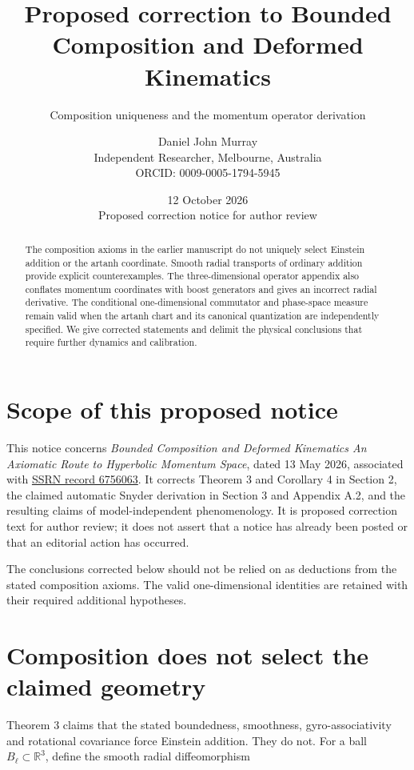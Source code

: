 \documentclass[
  11pt,
  a4paper,
]{article}
\title{Proposed correction to Bounded Composition and Deformed Kinematics}
\subtitle{Composition uniqueness and the momentum operator derivation}
\author{Daniel John Murray\\{\small Independent Researcher, Melbourne, Australia}\\{\small ORCID: 0009-0005-1794-5945}}
\date{12 October 2026\\{\small Proposed correction notice for author review}}
\begin{document}
\maketitle
\begin{abstract}
The composition axioms in the earlier manuscript do not uniquely select Einstein addition or the artanh coordinate. Smooth radial transports of ordinary addition provide explicit counterexamples. The three-dimensional operator appendix also conflates momentum coordinates with boost generators and gives an incorrect radial derivative. The conditional one-dimensional commutator and phase-space measure remain valid when the artanh chart and its canonical quantization are independently specified. We give corrected statements and delimit the physical conclusions that require further dynamics and calibration.
\end{abstract}

\section{Scope of this proposed notice}\label{scope-of-this-proposed-notice}

This notice concerns \emph{Bounded Composition and Deformed Kinematics An Axiomatic Route to Hyperbolic Momentum Space}, dated 13 May 2026, associated with \href{https://ssrn.com/abstract=6756063}{SSRN record 6756063}. It corrects Theorem 3 and Corollary 4 in Section 2, the claimed automatic Snyder derivation in Section 3 and Appendix A.2, and the resulting claims of model-independent phenomenology. It is proposed correction text for author review; it does not assert that a notice has already been posted or that an editorial action has occurred.

The conclusions corrected below should not be relied on as deductions from the stated composition axioms. The valid one-dimensional identities are retained with their required additional hypotheses.

\section{Composition does not select the claimed geometry}\label{composition-does-not-select-the-claimed-geometry}

Theorem 3 claims that the stated boundedness, smoothness, gyro-associativity and rotational covariance force Einstein addition. They do not. For a ball \(B_\ell\subset\mathbb R^3\), define the smooth radial diffeomorphism
\end{document}
